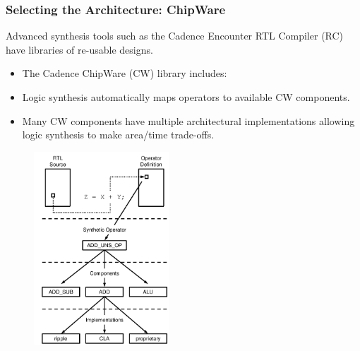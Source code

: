 \documentclass[t, notes, xcolor=table]{beamer}
\begin{document}
\begin{frame}
\frametitle{Selecting the Architecture: ChipWare}
\scriptsize{
Advanced synthesis tools such as the Cadence Encounter RTL Compiler (RC) have libraries of re-usable designs.
\begin{multicols}{2}
\begin{itemize}
\item The Cadence ChipWare (CW) library includes:

\item Logic synthesis automatically maps operators to available CW components.
\item Many CW components have multiple architectural implementations allowing logic synthesis to make area/time trade-offs.
\end{itemize}
\vfill
\columnbreak
\begin{figure}
    \includegraphics[width=0.45\textwidth]{img/17_chipware.png}
\end{figure}
\end{multicols}
}
\end{frame}
\end{document}
